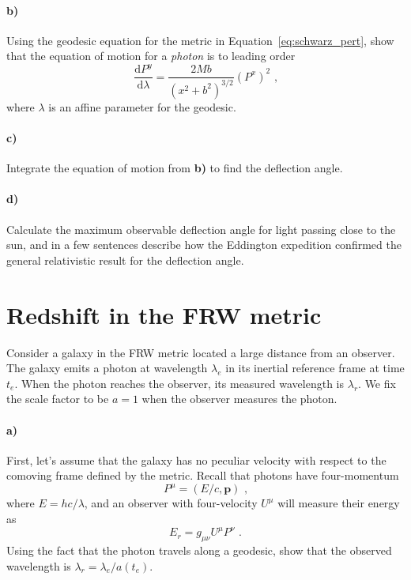 \documentclass[12pt]{article}
\newcommand\diff{\mathrm{d}}
\begin{document}
\paragraph{b)} Using the geodesic equation for the metric in
Equation~\ref{eq:schwarz_pert}, show that the equation of motion for a \emph{photon} is to leading order
\begin{equation}
    \frac{\diff P^y}{\diff \lambda}
    = \frac{2 M b}{\left(x^2 + b^2\right)^{3/2}} (P^x)^2 \text{ ,}
\end{equation}
where $\lambda$ is an affine parameter for the geodesic.

\paragraph{c)} Integrate the equation of motion from \textbf{b)} to find the
deflection angle.

\paragraph{d)} Calculate the maximum observable deflection angle for light passing close to the sun, and in a few sentences describe how the Eddington expedition confirmed the general relativistic result for the deflection angle.

\section{Redshift in the FRW metric}

Consider a galaxy in the FRW metric located a large distance from an observer.
The galaxy emits a photon at wavelength $\lambda_e$ in its inertial reference
frame at time $t_e$. When the photon reaches the observer, its measured
wavelength is $\lambda_{r}$. We fix the scale factor to be $a=1$ when the
observer measures the photon.

\paragraph{a)} First, let's assume that the galaxy has no peculiar velocity with
respect to the comoving frame defined by the metric. Recall that photons have
four-momentum
\begin{equation}
    P^\mu = \left(E / c, \mathbf{p}\right) \text{ ,}
\end{equation}
where $E = hc / \lambda$, and an observer with four-velocity $U^\mu$ will
measure their energy as
\begin{equation}
    E_r = g_{\mu \nu} U^\mu P^\nu \text{ .}
\end{equation}
Using the fact that the photon travels along a
geodesic, show that the observed wavelength is $\lambda_{r} = \lambda_e /
a(t_e)$.
\end{document}
